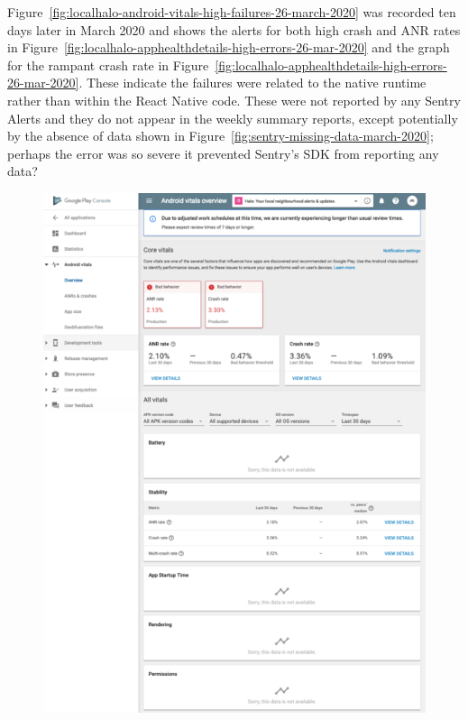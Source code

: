 Figure~\ref{fig:localhalo-android-vitals-high-failures-26-march-2020} was recorded ten days later in  March 2020 and shows the alerts for both high crash and ANR rates in Figure~\ref{fig:localhalo-apphealthdetails-high-errors-26-mar-2020} and the graph for the rampant crash rate in Figure~\ref{fig:localhalo-apphealthdetails-high-errors-26-mar-2020}. These indicate the failures were related to the native runtime rather than within the React Native code. These were not reported by any Sentry Alerts and they do not appear in the weekly summary reports, except potentially by the absence of data shown in Figure~\ref{fig:sentry-missing-data-march-2020}; perhaps the error was so severe it prevented Sentry's SDK from reporting any data?

\begin{figure}[htbp!]
\centering
\begin{minipage}{.45\textwidth}
  \centering
  \includegraphics[width=\textwidth]{images/localhalo/apphealthoverviewplace_5550596_high_errors.png}

\end{minipage}
\end{figure}
